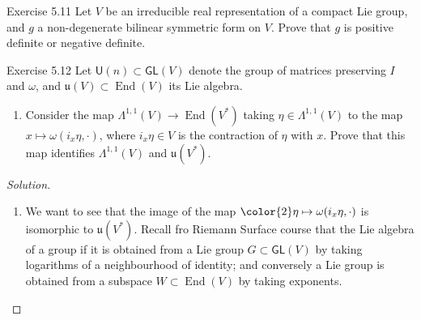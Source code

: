 \begin{thing1}{Exercise 5.11}\leavevmode
	Let $V$ be an irreducible real representation of a compact Lie group, and $g$ a non-degenerate bilinear symmetric form on $V$. Prove that $g$ is positive definite or negative definite.
\end{thing1}

\begin{thing4}{Exercise 5.12}\leavevmode
	Let $\mathsf{U}(n) \subset \mathsf{GL}(V)$ denote the group of matrices preserving  $I$ and $\omega$, and $\mathfrak{u}(V) \subset \operatorname{End}(V)$ its Lie algebra.
	\begin{enumerate}[label=\alph*.]
		\item Consider the map $\Lambda^{1,1}(V) \to  \operatorname{End}(V^*)$ taking $\eta\in\Lambda^{1,1}(V)$ to the map $x\mapsto \omega(i_x\eta,\cdot )$, where $i_x\eta\in V$ is the contraction of $\eta$ with $x$. Prove that this map identifies $\Lambda^{1,1}(V)$ and $\mathfrak{u}(V^*)$.
	\end{enumerate}
\end{thing4}

\begin{proof}[Solution]\leavevmode
	\begin{enumerate}[label=\alph*.]
		\item We want to see that the image of the map $\text{{\color{2}$\eta$}} \mapsto \omega(i_x\eta,\cdot )$ is isomorphic to $\mathfrak{u}(V^*)$. Recall fro Riemann Surface course that the Lie algebra of a group if it is obtained from a Lie group $G\subset \mathsf{GL}(V)$ by taking logarithms of a neighbourhood of identity; and conversely a Lie group is obtained from a subspace $W\subset \operatorname{End}(V)$ by taking exponents.
	\end{enumerate}
\end{proof}

\fi
\printbibliography



